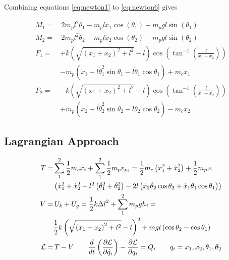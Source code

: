 \documentclass[conference]{IEEEtran}
\begin{document}
\vspace{20px}
Combining equations \ref{eq:newton1} to \ref{eq:newton6} gives
\begin{normalsize}
    \begin{equation}
        \begin{aligned}
            M_1 = & \, 2m_p l^2 \ddot{\theta}_1 - m_p l \ddot{x}_1 \cos \left(\theta_1\right) +m_p g l \sin \left(\theta_1\right) \\
            M_2 = & \, 2m_p l^2 \ddot{\theta}_2 - m_p l \ddot{x}_2 \cos \left(\theta_2\right) -m_p g l \sin \left(\theta_2\right) \\
            F_1 = & +k\left(\sqrt{\left(x_1+x_2\right)^2+l^2}-l\right) \cos \left(\tan ^{-1}\left(\frac{l}{x_1+x_2}\right)\right) \\
                  & -m_p\left(\ddot{x}_1+l \dot{\theta}_1^2 \sin \theta_1-l \ddot{\theta}_1 \cos \theta_1\right)+m_c \ddot{x}_1   \\
            F_2 = & -k\left(\sqrt{\left(x_1+x_2\right)^2+l^2}-l\right) \cos \left(\tan ^{-1}\left(\frac{l}{x_1+x_2}\right)\right) \\
                  & +m_p\left(\ddot{x}_2+l \dot{\theta}_2^2 \sin \theta_2-l \ddot{\theta}_2 \cos \theta_2\right)-m_c \ddot{x}_2
        \end{aligned}
    \end{equation}
\end{normalsize}

\subsection{Lagrangian Approach}
\begin{align*}
    T=           & \sum_{1}^{2}\frac{1}{2}m_c \dot{x}_i + \sum_{1}^{2}\frac{1}{2}m_p v_{p_i} = \frac{1}{2} m_c\left(\dot{x}_1^2+\dot{x}_2^2\right) +\frac{1}{2} m_p \times                                        \\
                 & \left(\dot{x}_1^2+\dot{x}_2^2+l^2\left(\dot{\theta}_1^2+\dot{\theta}_2^2\right)-2 l\left(\dot{x}_2 \dot{\theta}_2 \cos \theta_2+\dot{x}_1 \dot{\theta}_1 \cos \theta_1\right)\right)           \\
    V=           & \, U_k + U_g \footnotemark = \frac{1}{2} k {\Delta l}^2 + \sum_{1}^{2} m_p g h_i =                                                                                                             \\
                 & \frac{1}{2} k\left(\sqrt{\left(x_1+x_2\right)^2+l^2}-l\right)^2 + m g l \left(\cos \theta_2 - \cos \theta_1\right)                                                                             \\
    \mathcal{L}= & \, T-V \hspace{20px} \frac{d}{d t} \left(\frac{\partial \mathcal{L}}{\partial \dot{q}_i}\right)-\frac{\partial \mathcal{L}}{\partial q_i}=Q_i \hspace{20px} q_i = x_1, x_2, \theta_1, \theta_2
\end{align*}
\end{document}
